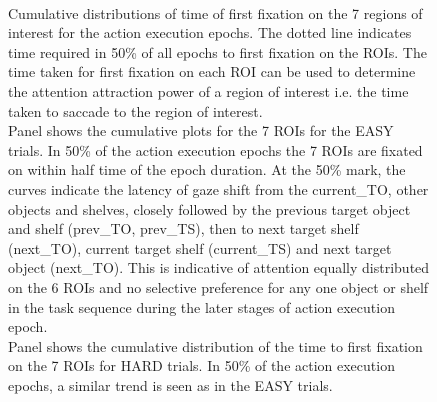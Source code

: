 \begin{figure}[h]
    \centering
     \\
    \caption[]{Cumulative distributions of time of first fixation on the 7 regions of interest for the action execution epochs. The dotted line indicates time required in 50\% of all epochs to first fixation on the ROIs. The time taken for first fixation on each ROI can be  used to determine the attention attraction power of a region of interest i.e. the time taken to saccade to the region of interest.\\
    Panel \protect{} shows the cumulative plots for the 7 ROIs for the EASY trials. In 50\% of the action execution epochs the 7 ROIs are fixated on within half time of the epoch duration. At the 50\% mark, the curves indicate the latency of gaze shift from the current\_TO, other objects and shelves, closely followed by the previous target object and shelf (prev\_TO, prev\_TS), then to next target shelf (next\_TO), current target shelf (current\_TS) and next target object (next\_TO). This is indicative of attention equally distributed on the 6 ROIs and no selective preference for any one object or shelf in the task sequence during the later stages of action execution epoch.\\
    Panel \protect{} shows the cumulative distribution of the time to first fixation on the 7 ROIs for HARD trials. In 50\% of the action execution epochs, a similar trend is seen as in the EASY trials.
    }
     \label{figure:t50_overall_exe}
\end{figure}



